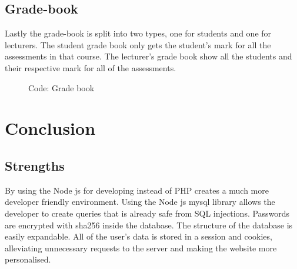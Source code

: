 \documentclass[a4paper,12pt]{article}
\numberwithin{equation}{section} %
\numberwithin{figure}{section}
\begin{document}
\subsection{Grade-book}
Lastly the grade-book is split into two types, one for students and one for lecturers. The student grade book only gets the student's mark for all the assessments in that course. The lecturer's grade book show all the students and their respective mark for all of the assessments. 

\begin{figure}[H]
\centering
{}
\caption{Code: Grade book}
\label{cGrade}
\end{figure}




%

\pagebreak
\section{Conclusion}

\subsection{Strengths}
By using the Node js for developing instead of PHP creates a much more developer friendly environment. Using the Node js mysql library allows the developer to create queries that is already safe from SQL injections. Passwords are encrypted with sha256 inside the database. The structure of the database is easily expandable. All of the user's data is stored in a session and cookies, alleviating unnecessary requests to the server and making the website more personalised.   
\end{document}
